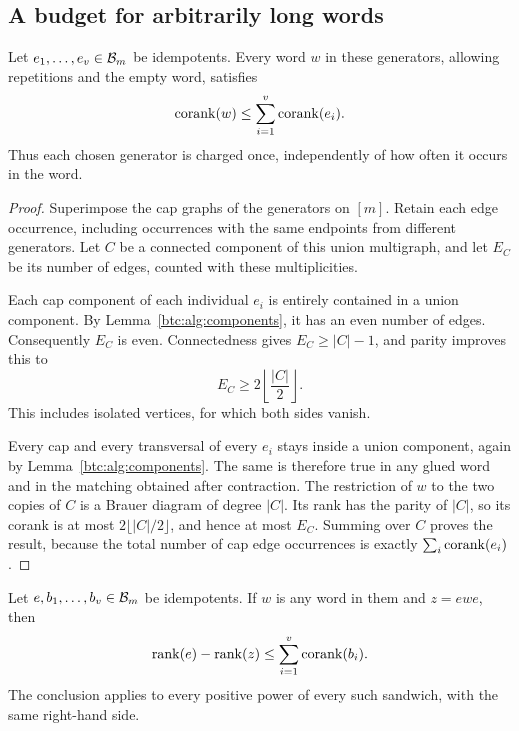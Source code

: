 \subsection{A budget for arbitrarily long words}
\label{btc:alg:budget-section}

\begin{theorem}\label{btc:alg:budget}
Let $e_1,\ldots,e_v\in\mathcal{B}_{m}$ be idempotents. Every word $w$ in
these generators, allowing repetitions and the empty word, satisfies
\begin{equation}\label{btc:alg:budget-eq}
 \operatorname{corank}(w)\le\sum_{i=1}^{v}\operatorname{corank}(e_i).
\end{equation}
Thus each chosen generator is charged once, independently of how
often it occurs in the word.
\end{theorem}

\begin{proof}
Superimpose the cap graphs of the generators on $[m]$. Retain each
edge occurrence, including occurrences with the same endpoints from
different generators. Let $C$ be a connected component of this union
multigraph, and let $E_C$ be its number of edges, counted with these
multiplicities.

Each cap component of each individual $e_i$ is entirely contained
in a union component. By Lemma~\ref{btc:alg:components}, it has an even
number of edges. Consequently $E_C$ is even. Connectedness gives
$E_C\ge |C|-1$, and parity improves this to
\begin{equation}\label{btc:alg:component-budget}
 E_C\ge 2\left\lfloor\frac{|C|}{2}\right\rfloor.
\end{equation}
This includes isolated vertices, for which both sides vanish.

Every cap and every transversal of every $e_i$ stays inside a union
component, again by Lemma~\ref{btc:alg:components}. The same is therefore
true in any glued word and in the matching obtained after contraction.
The restriction of $w$ to the two copies of $C$ is a Brauer diagram
of degree $|C|$. Its rank has the parity of $|C|$, so its corank is
at most $2\lfloor |C|/2\rfloor$, and hence at most $E_C$.
Summing over $C$ proves the result, because the total number of cap
edge occurrences is exactly $\sum_i\operatorname{corank}(e_i)$.
\end{proof}

\begin{corollary}\label{btc:alg:relative-budget}
Let $e,b_1,\ldots,b_v\in\mathcal{B}_{m}$ be idempotents. If $w$ is any word
in them and $z=ewe$, then
\begin{equation}\label{btc:alg:relative-budget-eq}
 \operatorname{rank}(e)-\operatorname{rank}(z)\le\sum_{i=1}^{v}\operatorname{corank}(b_i).
\end{equation}
The conclusion applies to every positive power of every such
sandwich, with the same right-hand side.
\end{corollary}

